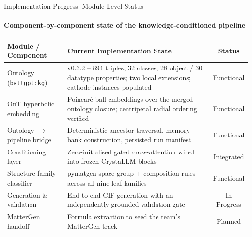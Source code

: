 \documentclass[aspectratio=169, 11pt]{beamer}
\begin{document}
\begin{frame}{Implementation Progress: Module-Level Status}
    \framesubtitle{Component-by-component state of the knowledge-conditioned pipeline}
    \vspace{-0.1cm}
    \begin{table}
        \centering
        \scriptsize
        \renewcommand{\arraystretch}{1.15}
        \begin{tabular}{p{3.4cm} p{7.2cm} c}
            \toprule
            \textbf{Module / Component} & \textbf{Current Implementation State} & \textbf{Status} \\
            \midrule
            Ontology (\texttt{battgpt:kg}) & v0.3.2 -- 894 triples, 32 classes, 28 object / 30 datatype properties; two local extensions; cathode instances populated & Functional \\
            OnT hyperbolic embedding & Poincar\'e ball embeddings over the merged ontology closure; centripetal radial ordering verified & Functional \\
            Ontology $\to$ pipeline bridge & Deterministic ancestor traversal, memory-bank construction, persisted run manifest & Functional \\
            Conditioning layer & Zero-initialised gated cross-attention wired into frozen CrystaLLM blocks & Integrated \\
            Structure-family classifier & pymatgen space-group + composition rules across all nine leaf families & Functional \\
            Generation \& validation & End-to-end CIF generation with an independently grounded validation gate & In Progress \\
            MatterGen handoff & Formula extraction to seed the team's MatterGen track & Planned \\
            \bottomrule
        \end{tabular}
    \end{table}

\end{frame}
\end{document}
